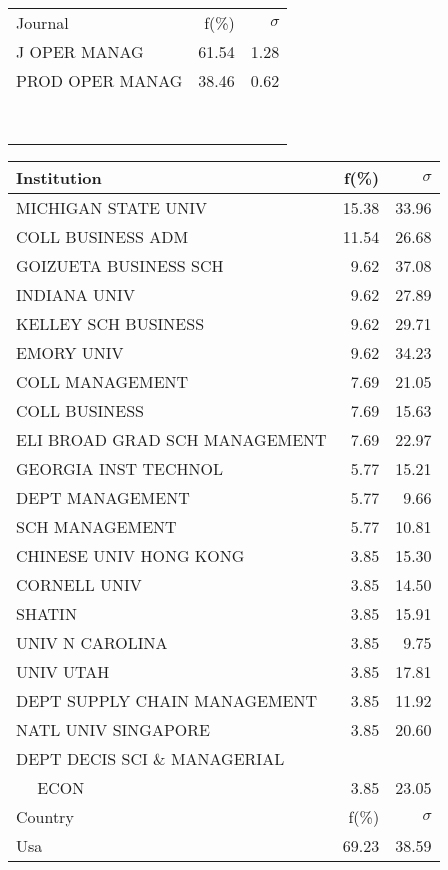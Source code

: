 \documentclass[a4paper,11pt]{report}
\begin{document}
\begin{landscape}
\begin{table}[!ht]
{\begin{tabular}{|l r r|}
 &  & \\
\hline
\hline
Journal & f(\%) & $\sigma$\\
\hline
J OPER MANAG & 61.54 & 1.28\\
PROD OPER MANAG & 38.46 & 0.62\\
 &  & \\
 &  & \\
 &  & \\
 &  & \\
 &  & \\
 &  & \\
 &  & \\
 &  & \\
\hline
\end{tabular}
}
{\scriptsize\begin{tabular}{|l r r|}
\hline
Institution & f(\%) & $\sigma$\\
\hline
MICHIGAN STATE UNIV & 15.38 & 33.96\\
COLL BUSINESS ADM & 11.54 & 26.68\\
GOIZUETA BUSINESS SCH & 9.62 & 37.08\\
INDIANA UNIV & 9.62 & 27.89\\
KELLEY SCH BUSINESS & 9.62 & 29.71\\
EMORY UNIV & 9.62 & 34.23\\
COLL MANAGEMENT & 7.69 & 21.05\\
COLL BUSINESS & 7.69 & 15.63\\
ELI BROAD GRAD SCH MANAGEMENT & 7.69 & 22.97\\
GEORGIA INST TECHNOL & 5.77 & 15.21\\
DEPT MANAGEMENT & 5.77 & 9.66\\
SCH MANAGEMENT & 5.77 & 10.81\\
CHINESE UNIV HONG KONG & 3.85 & 15.30\\
CORNELL UNIV & 3.85 & 14.50\\
SHATIN & 3.85 & 15.91\\
UNIV N CAROLINA & 3.85 & 9.75\\
UNIV UTAH & 3.85 & 17.81\\
DEPT SUPPLY CHAIN MANAGEMENT & 3.85 & 11.92\\
NATL UNIV SINGAPORE & 3.85 & 20.60\\
DEPT DECIS SCI \& MANAGERIAL &  & \\
$\quad$ ECON & 3.85 & 23.05\\
\hline
\hline
Country & f(\%) & $\sigma$\\
\hline
Usa & 69.23 & 38.59\\

\end{tabular}}
\end{table}
\end{landscape}
\end{document}
